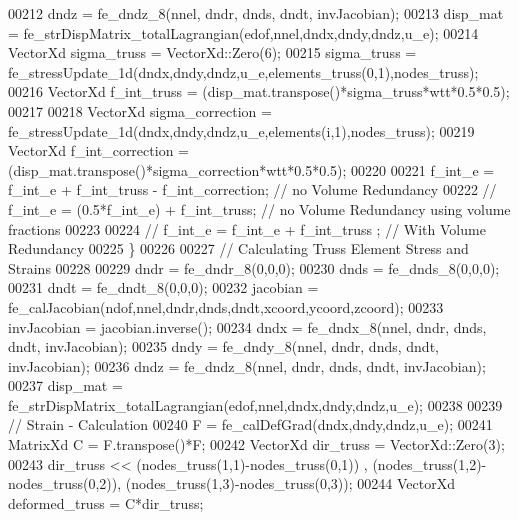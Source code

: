 \begin{DoxyCode}
00212 \textcolor{comment}{        dndz = fe\_dndz\_8(nnel, dndr, dnds, dndt, invJacobian);}
00213 \textcolor{comment}{        disp\_mat = fe\_strDispMatrix\_totalLagrangian(edof,nnel,dndx,dndy,dndz,u\_e);}
00214 \textcolor{comment}{        VectorXd sigma\_truss = VectorXd::Zero(6);}
00215 \textcolor{comment}{        sigma\_truss = fe\_stressUpdate\_1d(dndx,dndy,dndz,u\_e,elements\_truss(0,1),nodes\_truss);}
00216 \textcolor{comment}{        VectorXd f\_int\_truss = (disp\_mat.transpose()*sigma\_truss*wtt*0.5*0.5);}
00217 \textcolor{comment}{}
00218 \textcolor{comment}{        VectorXd sigma\_correction = fe\_stressUpdate\_1d(dndx,dndy,dndz,u\_e,elements(i,1),nodes\_truss);}
00219 \textcolor{comment}{        VectorXd f\_int\_correction = (disp\_mat.transpose()*sigma\_correction*wtt*0.5*0.5);}
00220 \textcolor{comment}{}
00221 \textcolor{comment}{        f\_int\_e = f\_int\_e + f\_int\_truss - f\_int\_correction; // no Volume Redundancy}
00222 \textcolor{comment}{        // f\_int\_e = (0.5*f\_int\_e) + f\_int\_truss; // no Volume Redundancy using volume fractions}
00223 \textcolor{comment}{}
00224 \textcolor{comment}{        // f\_int\_e = f\_int\_e + f\_int\_truss ; // With Volume Redundancy}
00225 \textcolor{comment}{    \}}
00226 \textcolor{comment}{}
00227 \textcolor{comment}{    // Calculating Truss Element Stress and Strains}
00228 \textcolor{comment}{}
00229 \textcolor{comment}{    dndr = fe\_dndr\_8(0,0,0);}
00230 \textcolor{comment}{    dnds = fe\_dnds\_8(0,0,0);}
00231 \textcolor{comment}{    dndt = fe\_dndt\_8(0,0,0);}
00232 \textcolor{comment}{    jacobian = fe\_calJacobian(ndof,nnel,dndr,dnds,dndt,xcoord,ycoord,zcoord);}
00233 \textcolor{comment}{    invJacobian = jacobian.inverse();}
00234 \textcolor{comment}{    dndx = fe\_dndx\_8(nnel, dndr, dnds, dndt, invJacobian);}
00235 \textcolor{comment}{    dndy = fe\_dndy\_8(nnel, dndr, dnds, dndt, invJacobian);}
00236 \textcolor{comment}{    dndz = fe\_dndz\_8(nnel, dndr, dnds, dndt, invJacobian);}
00237 \textcolor{comment}{    disp\_mat = fe\_strDispMatrix\_totalLagrangian(edof,nnel,dndx,dndy,dndz,u\_e);}
00238 \textcolor{comment}{}
00239 \textcolor{comment}{    // Strain - Calculation}
00240 \textcolor{comment}{        F = fe\_calDefGrad(dndx,dndy,dndz,u\_e);}
00241 \textcolor{comment}{        MatrixXd C = F.transpose()*F;}
00242 \textcolor{comment}{        VectorXd dir\_truss = VectorXd::Zero(3);}
00243 \textcolor{comment}{        dir\_truss << (nodes\_truss(1,1)-nodes\_truss(0,1)) , (nodes\_truss(1,2)-nodes\_truss(0,2)),
       (nodes\_truss(1,3)-nodes\_truss(0,3));}
00244 \textcolor{comment}{        VectorXd deformed\_truss = C*dir\_truss;}

\end{DoxyCode}
